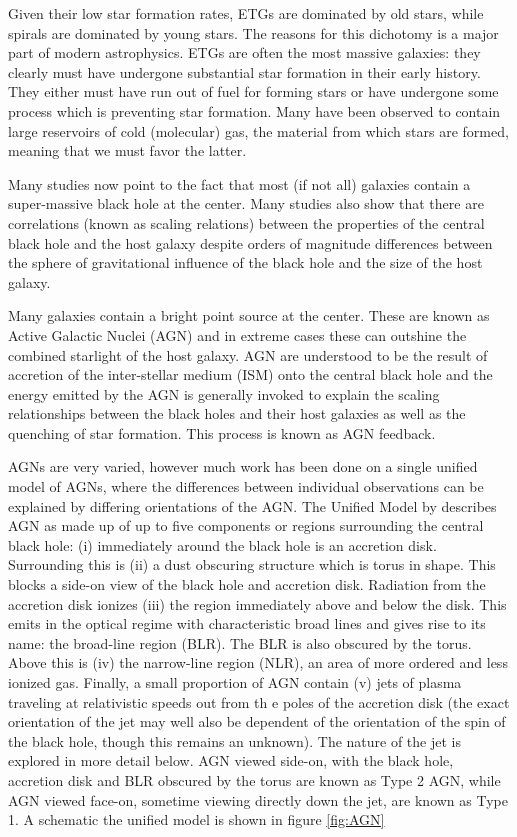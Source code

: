Given their low star formation rates, ETGs are dominated by old stars, while spirals are dominated by young stars. The reasons for this dichotomy is a major part of modern astrophysics. ETGs are often the most massive galaxies: they clearly must have undergone substantial star formation in their early history. They either must have run out of fuel for forming stars or have undergone some process which is preventing star formation. Many have been observed to contain large reservoirs of cold (molecular) gas, the material from which stars are formed, meaning that we must favor the latter. 

Many studies now point to the fact that most (if not all) galaxies contain a super-massive black hole at the center. Many studies also show that there are correlations (known as scaling relations) between the properties of the central black hole and the host galaxy despite orders of magnitude differences between the sphere of gravitational influence of the black hole and the size of the host galaxy. 

Many galaxies contain a bright point source at the center. These are known as Active Galactic Nuclei (AGN) and in extreme cases these can outshine the combined starlight of the host galaxy. AGN are understood to be the result of accretion of the inter-stellar medium (ISM) onto the central black hole and the energy emitted by the AGN is generally invoked to explain the scaling relationships between the black holes and their host galaxies as well as the quenching of star formation. This process is known as AGN feedback. 

AGNs are very varied, however much work has been done on a single unified model of AGNs, where the differences between individual observations can be explained by differing orientations of the AGN. The Unified Model by \citet{Antonucci1993} describes AGN as made up of up to five components or regions surrounding the central black hole: (i) immediately around the black hole is an accretion disk. Surrounding this is (ii) a dust obscuring structure which is torus in shape. This blocks a side-on view of the black hole and accretion disk. Radiation from the accretion disk ionizes (iii) the region immediately above and below the disk. This emits in the optical regime with characteristic broad lines and gives rise to its name: the broad-line region (BLR). The BLR is also obscured by the torus. Above this is (iv) the narrow-line region (NLR), an area of more ordered and less ionized gas. Finally, a small proportion of AGN contain (v) jets of plasma traveling at relativistic speeds out from th e poles of the accretion disk (the exact orientation of the jet may well also be dependent of the orientation of the spin of the black hole, though this remains an unknown). The nature of the jet is explored in more detail below. AGN viewed side-on, with the black hole, accretion disk and BLR obscured by the torus are known as Type 2 AGN, while AGN viewed face-on, sometime viewing directly down the jet, are known as Type 1. A schematic the unified model is shown in figure \ref{fig:AGN}

